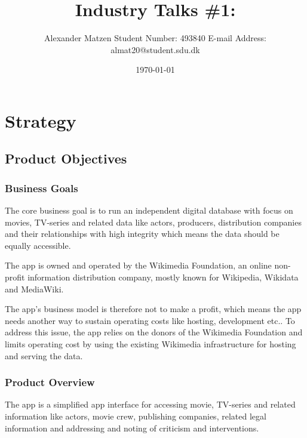 \documentclass[11pt]{article}
\begin{document}
\setlength\parindent{0pt}
\setlength{\parskip}{1em}
\pagestyle{empty}

\title{Industry Talks \#1: }
\author{Alexander Matzen \addvspace{1em} Student Number: 493840 \newline E-mail Address: almat20@student.sdu.dk}
\date{\today}


\pagecolor{white}

\tableofcontents

\addvspace{2.5cm}

\section{Strategy}

\subsection{Product Objectives}

\subsubsection{Business Goals}
The core business goal is to run an independent digital database with focus on movies, TV-series and related data like actors, producers, distribution companies and their relationships with high integrity which means the data should be equally accessible.


The app is owned and operated by the Wikimedia Foundation, an online non-profit information distribution company, mostly known for Wikipedia, Wikidata and MediaWiki.

The app's business model is therefore not to make a profit, which means the app needs another way to sustain operating costs like hosting, development etc.. To address this issue, the app relies on the donors of the Wikimedia Foundation and limits operating cost by using the existing Wikimedia infrastructure for hosting and serving the data.




\subsubsection{Product Overview}

The app is a simplified app interface for accessing movie, TV-series and related information like actors, movie crew, publishing companies, related legal information and addressing and noting of criticism and interventions.
\end{document}
